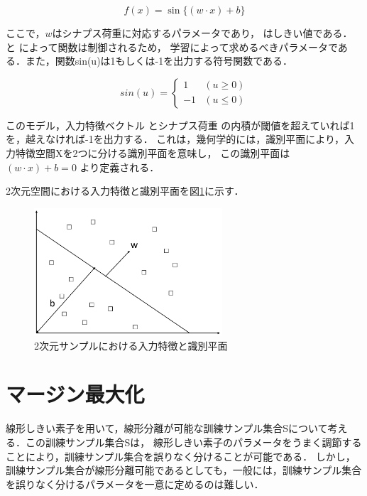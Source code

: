 \begin{equation}
     f(x) = \sin \{ (w \cdot x) + b \}
\end{equation}

ここで，$w$はシナプス荷重に対応するパラメータであり， はしきい値である． と によって関数は制御されるため，
学習によって求めるべきパラメータである．また，関数sin(u)は1もしくは-1を出力する符号関数である．

\begin{equation}
  sin(u) = \begin{cases}
    1 & (u \geq 0) \\
    -1 & (u \leq 0)
  \end{cases}
\end{equation}

このモデル，入力特徴ベクトル とシナプス荷重 の内積が閾値を超えていれば1を，越えなければ-1を出力する．
これは，幾何学的には，識別平面により，入力特徴空間Xを2つに分ける識別平面を意味し，
この識別平面は $ (w \cdot x) + b = 0 $ より定義される．

2次元空間における入力特徴と識別平面を図\ref{fig:heimen}に示す．

\begin{figure}[htbp]
  \begin{center}
    \includegraphics[clip,width=7.0cm]{./images/heimen.png}
    \caption{2次元サンプルにおける入力特徴と識別平面}
    \label{fig:heimen}
  \end{center}
\end{figure}


\section{マージン最大化}
線形しきい素子を用いて，線形分離が可能な訓練サンプル集合Sについて考える．この訓練サンプル集合Sは，
線形しきい素子のパラメータをうまく調節することにより，訓練サンプル集合を誤りなく分けることが可能である．
しかし，訓練サンプル集合が線形分離可能であるとしても，一般には，訓練サンプル集合を誤りなく分けるパラメータを一意に定めるのは難しい．

